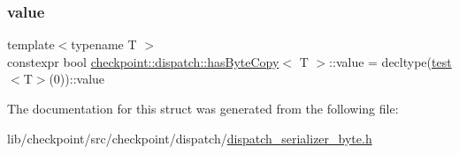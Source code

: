 \subsubsection{\texorpdfstring{value}{value}}
{\footnotesize\ttfamily template$<$typename T $>$ \\
constexpr bool \hyperlink{structcheckpoint_1_1dispatch_1_1has_byte_copy}{checkpoint\+::dispatch\+::has\+Byte\+Copy}$<$ T $>$\+::value = decltype(\hyperlink{structcheckpoint_1_1dispatch_1_1has_byte_copy_a12e7f6fcfaaccb6813490910bf4c58f6}{test}$<$T$>$(0))\+::value\hspace{0.3cm}{\ttfamily [static]}}



The documentation for this struct was generated from the following file\+:\begin{DoxyCompactItemize}
\item 
lib/checkpoint/src/checkpoint/dispatch/\hyperlink{dispatch__serializer__byte_8h}{dispatch\+\_\+serializer\+\_\+byte.\+h}\end{DoxyCompactItemize}

